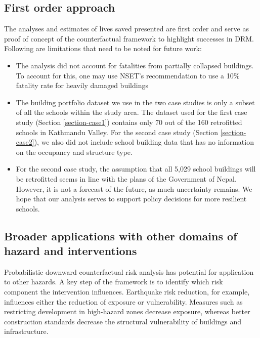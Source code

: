 \documentclass[utf8]{frontiersSCNS} %
\begin{document}
\vspace{0.5cm} %

\subsection{First order approach}

The analyses and estimates of lives saved presented are first order and serve as proof of concept of the counterfactual framework to highlight successes in DRM. Following are limitations that need to be noted for future work:

\begin{itemize}
    \item 
    The analysis did not account for fatalities from partially collapsed buildings. To account for this, one may use NSET's recommendation to use a 10\% fatality rate for heavily damaged buildings \citep{nset2000}
    \item
    The building portfolio dataset we use in the two case studies is only a subset of all the schools within the study area. The dataset used for the first case study (Section \ref{section-case1}) contains only 70 out of the 160 retrofitted schools in Kathmandu Valley. For the second case study (Section \ref{section-case2}), we also did not include school building data that has no information on the occupancy and structure type.
    \item
    For the second case study, the assumption that all 5,029 school buildings will be retrofitted seems in line with the plans of the Government of Nepal. However, it is not a forecast of the future, as much uncertainty remains. We hope that our analysis serves to support policy decisions for more resilient schools.
\end{itemize}

\subsection{Broader applications with other domains of hazard and interventions}

Probabilistic downward counterfactual risk analysis has potential for application to other hazards. A key step of the framework is to identify which risk component the intervention influences. Earthquake risk reduction, for example, influences either the reduction of exposure or vulnerability. Measures such as restricting development in high-hazard zones decrease exposure, whereas better construction standards decrease the structural vulnerability of buildings and infrastructure.
\end{document}
